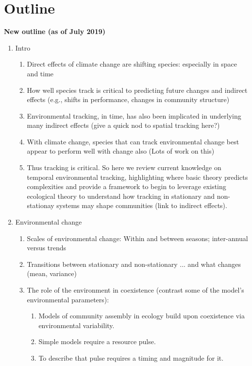 \documentclass[11pt,letterpaper]{article}
\begin{document}
\newpage
\section{Outline}


{\bf New outline (as of July 2019)} 
\begin{enumerate}
\item Intro
\begin{enumerate}
\item Direct effects of climate change are shifting species: especially in space and time 
\item How well species track is critical to predicting future changes and indirect effects (e.g., shifts in performance, changes in community structure) 
\item Environmental tracking, in time, has also been implicated in underlying many indirect effects (give a quick nod to spatial tracking here?)
\item With climate change, species that can track environmental change best appear to perform well with change also (Lots of work on this)
\item Thus tracking is critical. So here we review current knowledge on temporal environmental tracking, highlighting where basic theory predicts complexities and provide a framework to begin to leverage existing ecological theory to understand how tracking in stationary and non-stationay systems may shape communities (link to indirect effects).
\end{enumerate}
\item Environmental change
\begin{enumerate}
\item Scales of environmental change: Within and between seasons; inter-annual versus trends
\item Transitions between stationary and non-stationary ... and what changes (mean, variance) 
\item The role of the environment in coexistence (contrast some of the model's environmental parameters):
\begin{enumerate}
\item Models of community assembly in ecology build upon coexistence via environmental variability. %
\item Simple models require a resource pulse. 
\item To describe that pulse requires a timing and magnitude for it.  %

\end{enumerate}
\end{enumerate}
\end{enumerate}
\end{document}
